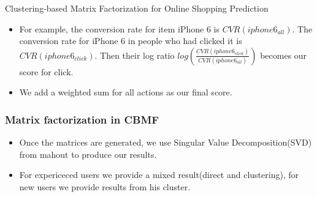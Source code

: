 \documentclass[xetex,mathserif,serif]{beamer}
\begin{document}
\begin{section}{Clustering-based Matrix Factorization for Online Shopping Prediction}
\begin{frame}
\begin{itemize}
    \item  For example, the conversion rate for item iPhone 6 is $CVR(iphone6_{all})$. The conversion rate for iPhone 6 in people who had clicked it is $CVR(iphone6_{click})$. Then their log ratio $log(\frac{CVR(iphone6_{click})}{CVR(iphone6_{all})})$ becomes our score for click. 

    \item We add a weighted sum for all actions as our final score.
    \end{itemize}
  \end{frame}
  \begin{frame}
    \frametitle{Matrix factorization in CBMF}
    \begin{itemize}
    \item Once the matrices are generated, we use Singular Value Decomposition(SVD) from mahout to produce our results.
    \item For expericeced users we provide a mixed result(direct and clustering), for new users we provide results from his cluster.
    \end{itemize}
    
  \end{frame}
\end{section}
\end{document}
